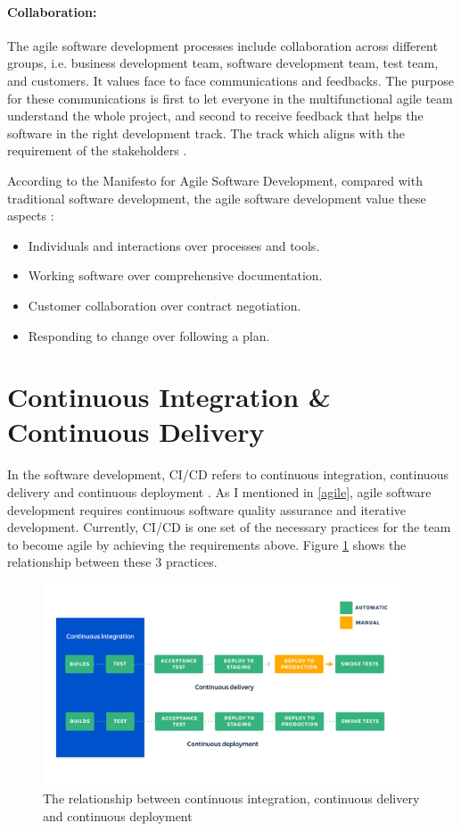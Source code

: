 \paragraph{Collaboration:}
The agile software development processes include collaboration across different groups, i.e. business development team, software development team, test team, and customers. It values face to face communications \cite{beck2001principles} and feedbacks. The purpose for these communications is first to let everyone in the multifunctional agile team understand the whole project, and second to receive feedback that helps the software in the right development track. The track which aligns with the requirement of the stakeholders \cite{beck2001manifesto}. 
\par
According to the Manifesto for Agile Software Development, compared with traditional software development, the agile software development value these aspects \cite{beck2001manifesto}: 
\begin{itemize}
\item Individuals and interactions over processes and tools.
\item Working software over comprehensive documentation.
\item Customer collaboration over contract negotiation.
\item Responding to change over following a plan.
\end{itemize}
\section{Continuous Integration \& Continuous Delivery}
In the software development, CI/CD refers to continuous integration, continuous delivery and continuous deployment \cite{pittet2018continuous}. As I mentioned in \ref{agile}, agile software development requires continuous software quality assurance and iterative development. Currently, CI/CD is one set of the necessary practices for the team to become agile by achieving the requirements above. Figure \ref{fig:cicd} shows the relationship between these 3 practices.
\begin{figure}[h]
    \centering
    \includegraphics[width=0.95\textwidth]{pics/cicd.png}
    \caption{The relationship between continuous integration, continuous delivery and continuous deployment \cite{pittet2018continuous}}
    \label{fig:cicd}
\end{figure}
